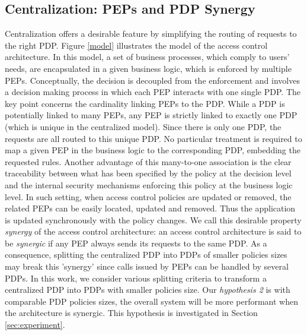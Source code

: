 \subsection{Centralization: PEPs and PDP Synergy}
Centralization offers a desirable feature by simplifying the routing of requests to the right PDP. 
Figure \ref{model} illustrates the model of the access control architecture. In this model, a set of business processes, which comply to users' needs, are encapsulated 
in a given business logic, which is enforced by multiple PEPs. Conceptually, the decision is decoupled from the enforcement and involves a decision making process in which each PEP 
interacts with one single PDP. The key point concerns the cardinality linking PEPs to the PDP. While a PDP is potentially linked to many PEPs, any PEP is strictly linked to exactly one 
PDP (which is unique in the centralized model). 
Since there is only one PDP, the requests are all routed to this unique PDP. No particular treatment is required to map a given PEP in the business logic to 
the corresponding PDP, embedding the requested rules. Another advantage of this many-to-one association is the clear traceability between what has been specified by the 
policy at the decision level and the internal security mechanisms enforcing this policy at the business logic level. In such setting, 
when access control policies are updated or removed, the related PEPs can be easily located, updated and removed. Thus the application is updated synchronously 
with the policy changes. We call this desirable property \textit{synergy} of the access control architecture: an access control architecture is said to be \textit{synergic} if any PEP always sends 
its requests to the same PDP. 
As a consequence, splitting the centralized PDP into PDPs of smaller policies sizes may break this 'synergy' since calls issued by PEPs can be handled by several PDPs. 
In this work, we consider various splitting criteria to transform a centralized PDP into PDPs with smaller policies size. 
Our \textit{hypothesis 2} is with comparable PDP policies sizes, the overall system will be more performant when the architecture is synergic. This hypothesis is investigated in 
Section \ref{sec:experiment}.

